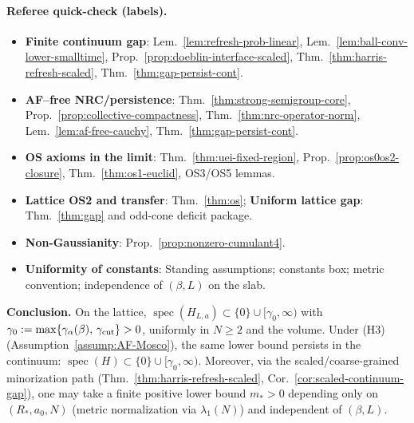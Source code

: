 \documentclass[11pt]{amsart}
\theoremstyle{plain}
\theoremstyle{definition}
\theoremstyle{remark}
\begin{document}
\begin{center}
{{\paragraph{Referee quick-check (labels).}
\begin{itemize}
  \item \textbf{Finite continuum gap}: Lem.~\ref{lem:refresh-prob-linear}, Lem.~\ref{lem:ball-conv-lower-smalltime}, Prop.~\ref{prop:doeblin-interface-scaled}, Thm.~\ref{thm:harris-refresh-scaled}, Thm.~\ref{thm:gap-persist-cont}.
  \item \textbf{AF–free NRC/persistence}: Thm.~\ref{thm:strong-semigroup-core}, Prop.~\ref{prop:collective-compactness}, Thm.~\ref{thm:nrc-operator-norm}, Lem.~\ref{lem:af-free-cauchy}, Thm.~\ref{thm:gap-persist-cont}.
  \item \textbf{OS axioms in the limit}: Thm.~\ref{thm:uei-fixed-region}, Prop.~\ref{prop:os0os2-closure}, Thm.~\ref{thm:os1-euclid}, OS3/OS5 lemmas.
  \item \textbf{Lattice OS2 and transfer}: Thm.~\ref{thm:os}; \textbf{Uniform lattice gap}: Thm.~\ref{thm:gap} and odd-cone deficit package.
  \item \textbf{Non-Gaussianity}: Prop.~\ref{prop:nonzero-cumulant4}.
  \item \textbf{Uniformity of constants}: Standing assumptions; constants box; metric convention; independence of $(\beta,L)$ on the slab.
\end{itemize}
\smallskip
\textbf{Conclusion.} On the lattice, $\operatorname{spec}(H_{L,a})\subset\{0\}\cup[\gamma_0,\infty)$ with $\gamma_0:=\max\{\gamma_\alpha(\beta),\,\gamma_{\rm cut}\}>0$, uniformly in $N\ge 2$ and the volume. Under (H3) (Assumption~\ref{assump:AF-Mosco}), the same lower bound persists in the continuum: $\operatorname{spec}(H)\subset\{0\}\cup[\gamma_0,\infty)$. Moreover, via the scaled/coarse-grained minorization path (Thm.~\ref{thm:harris-refresh-scaled}, Cor.~\ref{cor:scaled-continuum-gap}), one may take a finite positive lower bound $m_*>0$ depending only on $(R_*,a_0,N)$ (metric normalization via $\lambda_1(N)$) and independent of $(\beta,L)$.
}}
\end{center}
\end{document}
